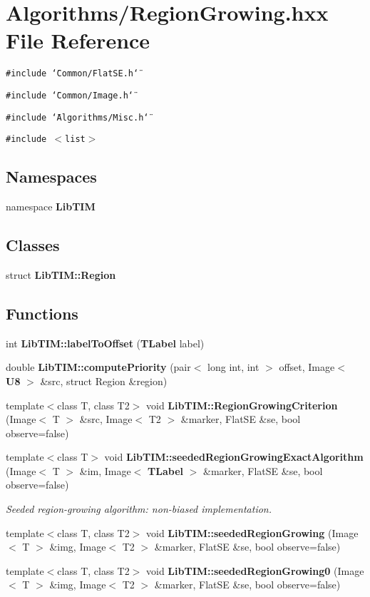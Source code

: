 \section{Algorithms/Region\-Growing.hxx File Reference}
\label{RegionGrowing_8hxx}
{\tt \#include \char`\"{}Common/Flat\-SE.h\char`\"{}}\par
{\tt \#include \char`\"{}Common/Image.h\char`\"{}}\par
{\tt \#include \char`\"{}Algorithms/Misc.h\char`\"{}}\par
{\tt \#include $<$list$>$}\par
\subsection*{Namespaces}
\begin{CompactItemize}
\item 
namespace {\bf Lib\-TIM}
\end{CompactItemize}
\subsection*{Classes}
\begin{CompactItemize}
\item 
struct {\bf Lib\-TIM::Region}
\end{CompactItemize}
\subsection*{Functions}
\begin{CompactItemize}
\item 
int {\bf Lib\-TIM::label\-To\-Offset} ({\bf TLabel} label)
\item 
double {\bf Lib\-TIM::compute\-Priority} (pair$<$ long int, int $>$ offset, Image$<$ {\bf U8} $>$ \&src, struct Region \&region)
\item 
template$<$class T, class T2$>$ void {\bf Lib\-TIM::Region\-Growing\-Criterion} (Image$<$ T $>$ \&src, Image$<$ T2 $>$ \&marker, Flat\-SE \&se, bool observe=false)
\item 
template$<$class T$>$ void {\bf Lib\-TIM::seeded\-Region\-Growing\-Exact\-Algorithm} (Image$<$ T $>$ \&im, Image$<$ {\bf TLabel} $>$ \&marker, Flat\-SE \&se, bool observe=false)
\begin{CompactList}\small\item\em Seeded region-growing algorithm: non-biased implementation. \item\end{CompactList}\item 
template$<$class T, class T2$>$ void {\bf Lib\-TIM::seeded\-Region\-Growing} (Image$<$ T $>$ \&img, Image$<$ T2 $>$ \&marker, Flat\-SE \&se, bool observe=false)
\item 
template$<$class T, class T2$>$ void {\bf Lib\-TIM::seeded\-Region\-Growing0} (Image$<$ T $>$ \&img, Image$<$ T2 $>$ \&marker, Flat\-SE \&se, bool observe=false)
\end{CompactItemize}
